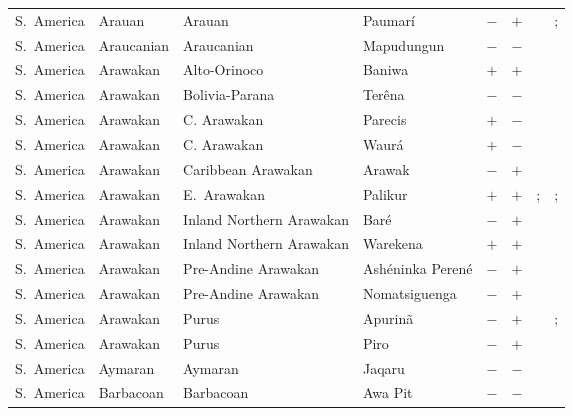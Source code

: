 \begin{landscape}
\begin{longtable}{l>{\raggedright\arraybackslash}p{2.2cm}>{\raggedright}p{2.5cm}>{\raggedright\arraybackslash}p{2.5cm}cc>{\raggedright\arraybackslash}p{3.4cm}>{\raggedright\arraybackslash}p{3.4cm}}
S.~America & Arauan & Arauan & Paumarí & $-$ & $+$ & \citealt{Gil2013} & \citealt{Corbett2013}; \citealt[237]{Aikhenvald2010}\\
S.~America & Araucanian & Araucanian & Mapudungun & $-$ & $-$ & \citealt{Gil2013} & \citealt{Corbett2013}\\
S.~America & Arawakan & Alto-Orinoco & Baniwa & $+$ & $+$ & \citealt[479--487]{Aikhenvald2007} & \citealt[476--479]{Aikhenvald2007}\\
S.~America & Arawakan & Bolivia-Parana & Terêna & $-$ & $-$ & \citealt{Gil2013} & \citealt[252]{Derbyshire1990}\\
S.~America & Arawakan & C. Arawakan & Parecis & $+$ & $-$ & \citealt{Gil2013} & \citealt[4]{Brandao2014}\\
S.~America & Arawakan & C. Arawakan & Waurá & $+$ & $-$ & \citealt{Gil2013} & \citealt[377]{Payne1991}\\
S.~America & Arawakan & Caribbean Arawakan & Arawak & $-$ & $+$ & \citealt{Gil2013} & \citealt[23, 28--29]{Pet1987}\\
S.~America & Arawakan & E.~Arawakan & Palikur & $+$ & $+$ & \citealt{Gil2013}; \citealt[192--198]{Aikhenvald2000} & \citealt[262--263]{Derbyshire1990}; \citealt[192--198]{Aikhenvald2000}\\
S.~America & Arawakan & Inland Northern Arawakan & Baré & $-$ & $+$ & \citealt{Gil2013} & \citealt[850--852]{Aikhenvald2007}\\
S.~America & Arawakan & Inland Northern Arawakan & Warekena & $+$ & $+$ & \citealt{Gil2013} & \citealt[298--299]{Aikhenvald1998}\\
S.~America & Arawakan & Pre-Andine Arawakan & Ashéninka Perené & $-$ & $+$ & \citealt[184--185]{Mihas2010} & \citealt[121--122]{Mihas2010}\\
S.~America & Arawakan & Pre-Andine Arawakan & Nomatsiguenga & $-$ & $+$ & \citealt[262]{Derbyshire1990} & \citealt[262]{Derbyshire1990}\\
S.~America & Arawakan & Purus & Apurinã & $-$ & $+$ & \citealt{Gil2013} & \citealt{Corbett2013}; \citealt[145--148, 222--232, 348--349]{SilvaFacundes2000}\\
S.~America & Arawakan & Purus & Piro & $-$ & $+$ & \citealt{Gil2013} & \citealt[248]{Derbyshire1990}\\
S.~America & Aymaran & Aymaran & Jaqaru & $-$ & $-$ & \citealt{Gil2013} & \citealt{Corbett2013}\\
S.~America & Barbacoan & Barbacoan & Awa Pit & $-$ & $-$ & \citealt[86, 93--94]{Curnow1997} & \citealt{Corbett2013}\\

\end{longtable}
\end{landscape}
